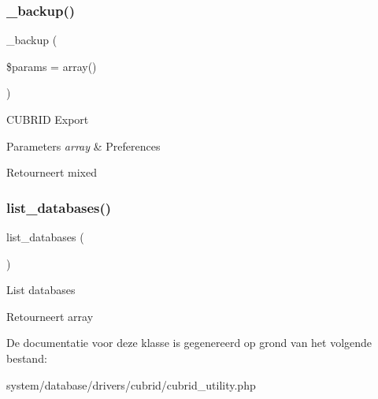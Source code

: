 \subsubsection{\texorpdfstring{\_backup()}{\_backup()}}
{\footnotesize\ttfamily \+\_\+backup (\begin{DoxyParamCaption}\item[{}]{\$params = {\ttfamily array()} }\end{DoxyParamCaption})\hspace{0.3cm}{\ttfamily [protected]}}

C\+U\+B\+R\+ID Export


\begin{DoxyParams}{Parameters}
{\em array} & Preferences \\
\hline
\end{DoxyParams}
\begin{DoxyReturn}{Retourneert}
mixed 
\end{DoxyReturn}
\mbox{\label{class_c_i___d_b__cubrid__utility_a8486b247a8868504b055622cb2dd34d3}} 
\subsubsection{\texorpdfstring{list\_databases()}{list\_databases()}}
{\footnotesize\ttfamily list\+\_\+databases (\begin{DoxyParamCaption}{ }\end{DoxyParamCaption})}

List databases

\begin{DoxyReturn}{Retourneert}
array 
\end{DoxyReturn}


De documentatie voor deze klasse is gegenereerd op grond van het volgende bestand\+:\begin{DoxyCompactItemize}
\item 
system/database/drivers/cubrid/cubrid\+\_\+utility.\+php\end{DoxyCompactItemize}
